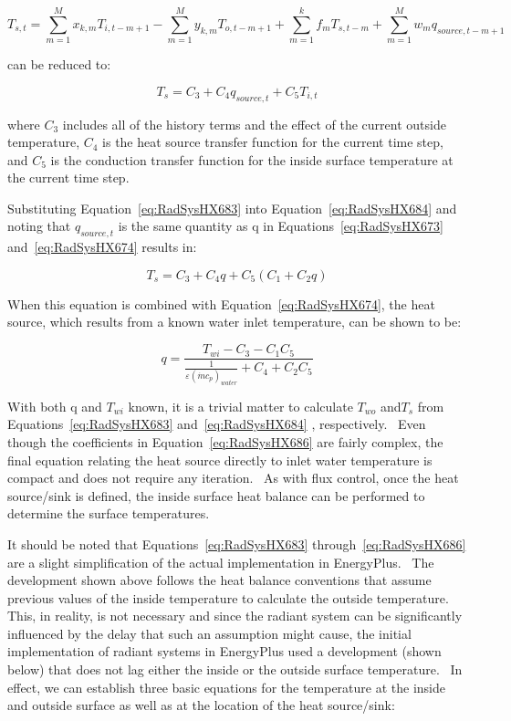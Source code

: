 {\begin{equation}
{T_{s,t}} = \sum\limits_{m = 1}^M {{x_{k,m}}{T_{i,t - m + 1}}}  - \sum\limits_{m = 1}^M {{y_{k,m}}{T_{o,t - m + 1}}}  + \sum\limits_{m = 1}^k {{f_m}{T_{s,t - m}}}  + \sum\limits_{m = 1}^M {{w_m}{q_{source,t - m + 1}}}
\end{equation}

can be reduced to:

\begin{equation}
{T_s} = {C_3} + {C_4}{q_{source,t}} + {C_5}{T_{i,t}}
\label{eq:RadSysHX684}
\end{equation}

where \(C_3\) includes all of the history terms and the effect of the current outside temperature, \(C_4\) is the heat source transfer function for the current time step, and \(C_5\) is the conduction transfer function for the inside surface temperature at the current time step.

Substituting Equation~\ref{eq:RadSysHX683} into Equation~\ref{eq:RadSysHX684} and noting that \(q_{source,t}\) is the same quantity as q in Equations~\ref{eq:RadSysHX673} and~\ref{eq:RadSysHX674} results in:

\begin{equation}
{T_s} = {C_3} + {C_4}q + {C_5}\left( {{C_1} + {C_2}q} \right)
\end{equation}

When this equation is combined with Equation~\ref{eq:RadSysHX674}, the heat source, which results from a known water inlet temperature, can be shown to be:

\begin{equation}
q = \frac{{{T_{wi}} - {C_3} - {C_1}{C_5}}}{{\frac{1}{{\varepsilon {{\left( {\dot m{c_p}} \right)}_{water}}}} + {C_4} + {C_2}{C_5}}}
\label{eq:RadSysHX686}
\end{equation}

With both q and \(T_{wi}\) known, it is a trivial matter to calculate \(T_{wo}\) and\(T_s\) from Equations~\ref{eq:RadSysHX683} and~\ref{eq:RadSysHX684} , respectively.~ Even though the coefficients in Equation~\ref{eq:RadSysHX686} are fairly complex, the final equation relating the heat source directly to inlet water temperature is compact and does not require any iteration.~ As with flux control, once the heat source/sink is defined, the inside surface heat balance can be performed to determine the surface temperatures.

It should be noted that Equations~\ref{eq:RadSysHX683} through~\ref{eq:RadSysHX686} are a slight simplification of the actual implementation in EnergyPlus.~ The development shown above follows the heat balance conventions that assume previous values of the inside temperature to calculate the outside temperature.~ This, in reality, is not necessary and since the radiant system can be significantly influenced by the delay that such an assumption might cause, the initial implementation of radiant systems in EnergyPlus used a development (shown below) that does not lag either the inside or the outside surface temperature.~ In effect, we can establish three basic equations for the temperature at the inside and outside surface as well as at the location of the heat source/sink:

}
